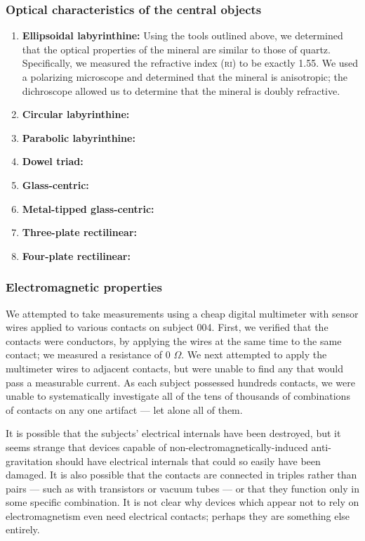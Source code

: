 \documentclass[10pt]{article}
\theoremstyle{definition}
\begin{document}
\subsubsection{Optical characteristics of the central objects}
\begin{enumerate}[(001)]
\item \textbf{Ellipsoidal labyrinthine:} Using the tools outlined above, we determined that the optical properties of the mineral are similar to those of quartz.
    Specifically, we measured the refractive index (\textsc{ri}) to be exactly 1.55.
    We used a polarizing microscope and determined that the mineral is anisotropic; the dichroscope allowed us to determine that the mineral is doubly refractive.
\item \textbf{Circular labyrinthine:}
\item \textbf{Parabolic labyrinthine:}
\item \textbf{Dowel triad:}
\item \textbf{Glass-centric:}
\item \textbf{Metal-tipped glass-centric:}
\item \textbf{Three-plate rectilinear:}
\item \textbf{Four-plate rectilinear:}
\end{enumerate}

\subsubsection{Electromagnetic properties}
We attempted to take measurements using a cheap digital multimeter with sensor wires applied to various contacts on subject 004.
First, we verified that the contacts were conductors, by applying the wires at the same time to the same contact; we measured a resistance of 0 $\Omega$.
We next attempted to apply the multimeter wires to adjacent contacts, but were unable to find any that would pass a measurable current.
As each subject possessed hundreds contacts, we were unable to systematically investigate all of the tens of thousands of combinations of contacts on any one artifact --- let alone all of them. 

It is possible that the subjects' electrical internals have been destroyed, but it seems strange that devices capable of non-electromagnetically-induced anti-gravitation should have electrical internals that could so easily have been damaged.
It is also possible that the contacts are connected in triples rather than pairs --- such as with transistors or vacuum tubes --- or that they function only in some specific combination.
It is not clear why devices which appear not to rely on electromagnetism even need electrical contacts; perhaps they are something else entirely.
\end{document}
